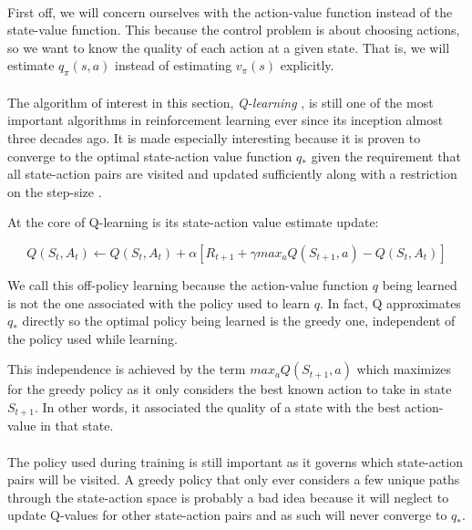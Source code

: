 \paragraph{}
First off, we will concern ourselves with
the action-value function instead of the state-value function.
This because the control problem
is about choosing actions,
so we want to know the quality of each action
at a given state.
That is, we will estimate $q_\pi(s,a)$
instead of estimating $v_\pi(s)$ explicitly.

\paragraph{}
The algorithm of interest in this section,
\textit{Q-learning} \parencite{watkins1989learning},
is still one of the most important algorithms
in reinforcement learning
ever since its inception almost three decades ago.
It is made especially interesting because
it is proven to converge
to the optimal state-action value function $q_*$
given the requirement that all state-action pairs
are visited and updated sufficiently
along with a restriction on the step-size
\parencite{watkins1992q}.

At the core of Q-learning is its state-action value estimate update:

\begin{equation}
  \label{eq:qlearning}
  Q(S_t, A_t) \leftarrow Q(S_t, A_t) + \alpha \left[ R_{t+1} + \gamma max_a Q(S_{t+1}, a) - Q(S_t, A_t) \right]
\end{equation}

We call this off-policy learning because
the action-value function $q$ being learned
is not the one associated with the policy used to learn $q$.
In fact, Q approximates $q_*$ directly
so the optimal policy being learned is the greedy one,
independent of the policy used while learning.

This independence is achieved by the term
$max_aQ(S_{t+1},a)$
which maximizes for the greedy policy
as it only considers the best known action to take
in state $S_{t+1}$.
In other words, it associated the quality of a state
with the best action-value in that state.

\paragraph{}
The policy used during training is still important
as it governs which state-action pairs will be visited.
A greedy policy that only ever considers a few unique paths
through the state-action space
is probably a bad idea because it will neglect to update
Q-values for other state-action pairs
and as such will never converge to $q_*$.

